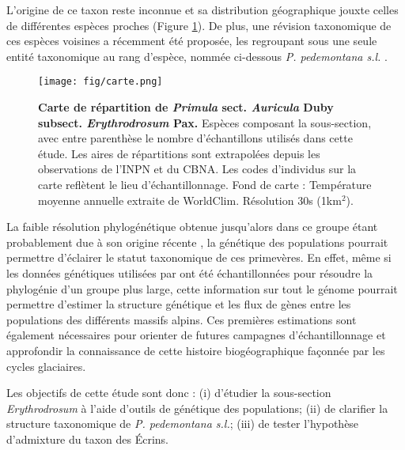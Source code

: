L'origine de ce taxon reste inconnue et sa distribution géographique jouxte celles de dif\-férentes espèces proches (Figure \ref{carte}). De plus, une révision taxonomique de ces espèces voisines a récem\-ment été proposée, les regroupant sous une seule entité taxonomique au rang d'espèce, nommée ci-dessous \textit{P. pedemontana s.l.} \citep{Boucher2016a}. 

\begin{figure}[!ht]
    \centering
    \texttt{[image: fig/carte.png]}
    \caption{\textbf{Carte de répartition de \textit{Primula} sect. \textit{Auricula} Duby subsect. \textit{Erythrodrosum} Pax.} Espèces composant la sous-section, avec entre parenthèse le nombre d'échantillons utilisés dans cette étude. Les aires de répartitions sont extrapolées depuis les observations de l'INPN et du CBNA. Les codes d'individus sur la carte reflètent le lieu d'échantillonnage. Fond de carte : Température moyenne annuelle extraite de WorldClim. Résolution 30s (1km$^{2}$).}
    \label{carte}
    \centering
\end{figure} 

La faible résolution phylogénétique obtenue jusqu'alors dans ce groupe étant probablement due à son origine récente \citep{Boucher2016} , la génétique des populations pourrait permettre d'éclairer le statut taxonomique de ces primevères. En effet, même si les données génétiques utilisées par \citet{Boucher2016a} ont été échantillonnées pour résoudre la phylogénie d'un groupe plus large, cette information sur tout le génome pourrait permettre d'estimer la structure génétique et les flux de gènes entre les populations des différents massifs alpins. Ces premières estimations sont également nécessaires pour orienter de futures campagnes d'échantillonnage et approfondir la connaissance de cette histoire biogéographique façonnée par les cycles glaciaires. 

Les objectifs de cette étude sont donc : (i) d'étudier la sous-section \textit{Erythrodrosum} à l'aide d'outils de génétique des populations; (ii) de clarifier la structure taxonomique de \textit{P. pedemontana s.l.}; (iii) de tester l'hypothèse d'admixture du taxon des Écrins.

